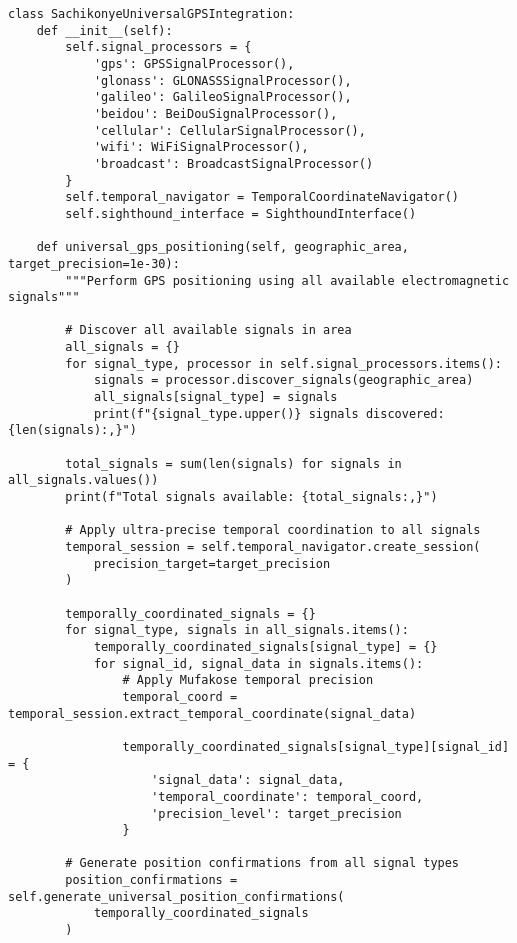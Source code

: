 \documentclass[12pt,a4paper]{article}
\begin{document}
\begin{lstlisting}[style=pythonstyle, caption=Universal Signal Integration for GPS Enhancement]
class SachikonyeUniversalGPSIntegration:
    def __init__(self):
        self.signal_processors = {
            'gps': GPSSignalProcessor(),
            'glonass': GLONASSSignalProcessor(),
            'galileo': GalileoSignalProcessor(),
            'beidou': BeiDouSignalProcessor(),
            'cellular': CellularSignalProcessor(),
            'wifi': WiFiSignalProcessor(),
            'broadcast': BroadcastSignalProcessor()
        }
        self.temporal_navigator = TemporalCoordinateNavigator()
        self.sighthound_interface = SighthoundInterface()
    
    def universal_gps_positioning(self, geographic_area, target_precision=1e-30):
        """Perform GPS positioning using all available electromagnetic signals"""
        
        # Discover all available signals in area
        all_signals = {}
        for signal_type, processor in self.signal_processors.items():
            signals = processor.discover_signals(geographic_area)
            all_signals[signal_type] = signals
            print(f"{signal_type.upper()} signals discovered: {len(signals):,}")
        
        total_signals = sum(len(signals) for signals in all_signals.values())
        print(f"Total signals available: {total_signals:,}")
        
        # Apply ultra-precise temporal coordination to all signals
        temporal_session = self.temporal_navigator.create_session(
            precision_target=target_precision
        )
        
        temporally_coordinated_signals = {}
        for signal_type, signals in all_signals.items():
            temporally_coordinated_signals[signal_type] = {}
            for signal_id, signal_data in signals.items():
                # Apply Mufakose temporal precision
                temporal_coord = temporal_session.extract_temporal_coordinate(signal_data)
                
                temporally_coordinated_signals[signal_type][signal_id] = {
                    'signal_data': signal_data,
                    'temporal_coordinate': temporal_coord,
                    'precision_level': target_precision
                }
        
        # Generate position confirmations from all signal types
        position_confirmations = self.generate_universal_position_confirmations(
            temporally_coordinated_signals
        )
        

\end{lstlisting}
\end{document}
